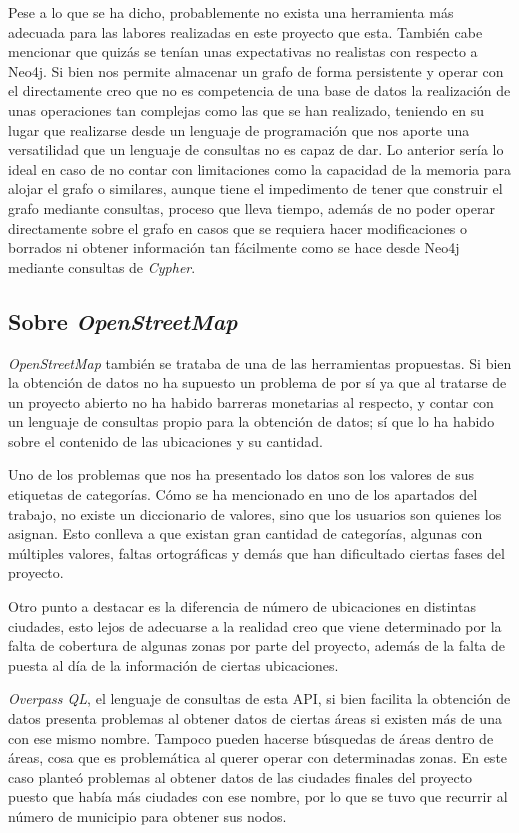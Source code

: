 Pese a lo que se ha dicho, probablemente no exista una herramienta más adecuada para las labores realizadas en este proyecto que esta. También cabe mencionar que quizás se tenían unas expectativas no realistas con respecto a Neo4j. Si bien nos permite almacenar un grafo de forma persistente y operar con el directamente creo que no es competencia de una base de datos la realización de unas operaciones tan complejas como las que se han realizado, teniendo en su lugar que realizarse desde un lenguaje de programación que nos aporte una versatilidad que un lenguaje de consultas no es capaz de dar. Lo anterior sería lo ideal en caso de no contar con limitaciones como la capacidad de la memoria para alojar el grafo o similares, aunque tiene el impedimento de tener que construir el grafo mediante consultas, proceso que lleva tiempo, además de no poder operar directamente sobre el grafo en casos que se requiera hacer modificaciones o borrados ni obtener información tan fácilmente como se hace desde Neo4j mediante consultas de \textit{Cypher}.



\subsection{Sobre \textit{OpenStreetMap}}

\textit{OpenStreetMap} también se trataba de una de las herramientas propuestas. Si bien la obtención de datos no ha supuesto un problema de por sí ya que al tratarse de un proyecto abierto no ha habido barreras monetarias al respecto, y contar con un lenguaje de consultas propio para la obtención de datos; sí que lo ha habido sobre el contenido de las ubicaciones y su cantidad.

Uno de los problemas que nos ha presentado los datos son los valores de sus etiquetas de categorías. Cómo se ha mencionado en uno de los apartados del trabajo, no existe un diccionario de valores, sino que los usuarios son quienes los asignan. Esto conlleva a que existan gran cantidad de categorías, algunas con múltiples valores, faltas ortográficas y demás que han dificultado ciertas fases del proyecto.

Otro punto a destacar es la diferencia de número de ubicaciones en distintas ciudades, esto lejos de adecuarse a la realidad creo que viene determinado por la falta de cobertura de algunas zonas por parte del proyecto, además de la falta de puesta al día de la información de ciertas ubicaciones.

\textit{Overpass QL}, el lenguaje de consultas de esta API, si bien facilita la obtención de datos presenta problemas al obtener datos de ciertas áreas si existen más de una con ese mismo nombre. Tampoco pueden hacerse búsquedas de áreas dentro de áreas, cosa que es problemática al querer operar con determinadas zonas. En este caso planteó problemas al obtener datos de las ciudades finales del proyecto puesto que había más ciudades con ese nombre, por lo que se tuvo que recurrir al número de municipio para obtener sus nodos.

